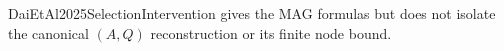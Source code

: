DaiEtAl2025SelectionIntervention gives the MAG formulas but does not isolate the canonical \((A,Q)\) reconstruction or its finite node bound.